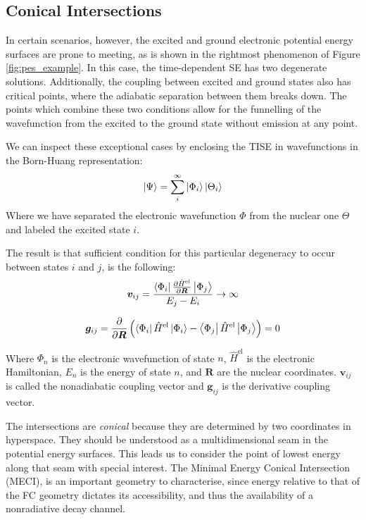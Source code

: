 \subsection{Conical Intersections}
\label{sec:conicals_sec}
In certain scenarios, however, the excited and ground electronic potential energy surfaces are prone to meeting, as is shown in the rightmost phenomenon of Figure \ref{fig:pes_example}. In this case, the time-dependent SE has two degenerate solutions. Additionally, the coupling between excited and ground states also has critical points, where the adiabatic separation between them breaks down. The points which combine these two conditions allow for the funnelling of the wavefunction from the excited to the ground state without emission at any point.

We can inspect these exceptional cases by enclosing the TISE in wavefunctions in the Born-Huang representation:
\begin{equation}
    \ket{\Psi} = \sum_i^\infty \ket{\Phi_i} \ket{\Theta_i}
    \label{eq:bornhuang}
\end{equation}
Where we have separated the electronic wavefunction $\Phi$ from the nuclear one $\Theta$ and labeled the excited state $i$.

The result is that sufficient condition for this particular degeneracy to occur between states $i$ and $j$, is the following:
\begin{equation}
    \bm{v}_{ij} = \frac{\bra{\Phi_i} \frac{\partial \hat{H}^{\text{el}}}{\partial \bm{R}} \ket{\Phi_j} }{E_j-E_i} \rightarrow \infty
\end{equation}

\begin{equation}
    \bm{g}_{ij} = \frac{\partial}{\partial \bm{R}} \left(\bra{\Phi_i} \hat{H}^{\text{el}} \ket{\Phi_i} - \bra{\Phi_j} \hat{H}^{\text{el}} \ket{\Phi_j}\right) = 0
\end{equation}

Where $\Phi_n$ is the electronic wavefunction of state $n$, $\hat{H}^{\text{el}}$ is the electronic Hamiltonian, $E_n$ is the energy of state $n$, and $\bm{R}$ are the nuclear coordinates. $\bm{v}_{ij}$ is called the nonadiabatic coupling vector and $\bm{g}_{ij}$ is the derivative coupling vector.\cite{Mead1982}

The intersections are \textit{conical} because they are determined by two coordinates in hyperspace. They should be understood as a multidimensional seam in the potential energy surfaces.\cite{Yarkony1998} This leads us to consider the point of lowest energy along that seam with special interest. The Minimal Energy Conical Intersection (MECI), is an important geometry to characterise, since energy relative to that of the FC geometry dictates its accessibility, and thus the availability of a nonradiative decay channel.

